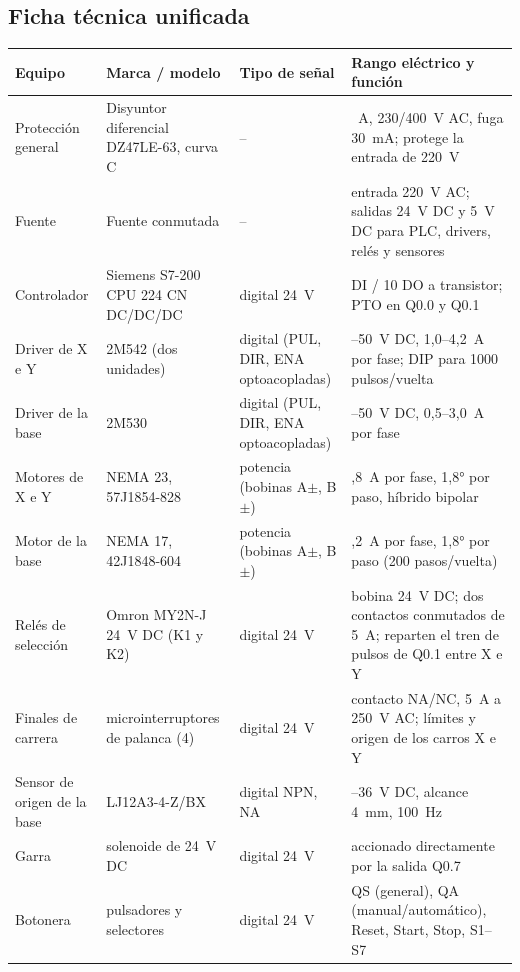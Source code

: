 \documentclass[a4paper,11pt]{article}
\begin{document}
\subsection{Ficha técnica unificada}\label{sec:ficha}
\begin{center}\small
\begin{longtable}{>{\raggedright}p{2.6cm} >{\raggedright}p{3.6cm} >{\raggedright}p{2.4cm} >{\raggedright\arraybackslash}p{5.6cm}}
\toprule
\textbf{Equipo} & \textbf{Marca / modelo} & \textbf{Tipo de señal} & \textbf{Rango eléctrico y función}\\
\midrule\endhead
Protección general & Disyuntor diferencial DZ47LE-63, curva C & -- & 16~A, 230/400~V AC, fuga 30~mA; protege la entrada de 220~V\\
Fuente & Fuente conmutada & -- & entrada 220~V AC; salidas 24~V DC y 5~V DC para PLC, drivers, relés y sensores\\
Controlador & Siemens S7-200 CPU 224 CN DC/DC/DC & digital 24~V & 14 DI / 10 DO a transistor; PTO en Q0.0 y Q0.1\\
Driver de X e Y & 2M542 (dos unidades) & digital (PUL, DIR, ENA optoacopladas) & 20--50~V DC, 1,0--4,2~A por fase; DIP para 1000 pulsos/vuelta\\
Driver de la base & 2M530 & digital (PUL, DIR, ENA optoacopladas) & 18--50~V DC, 0,5--3,0~A por fase\\
Motores de X e Y & NEMA 23, 57J1854-828 & potencia (bobinas A$\pm$, B$\pm$) & 2,8~A por fase, 1,8° por paso, híbrido bipolar\\
Motor de la base & NEMA 17, 42J1848-604 & potencia (bobinas A$\pm$, B$\pm$) & 1,2~A por fase, 1,8° por paso (200 pasos/vuelta)\\
Relés de selección & Omron MY2N-J 24~V DC (K1 y K2) & digital 24~V & bobina 24~V DC; dos contactos conmutados de 5~A; reparten el tren de pulsos de Q0.1 entre X e Y\\
Finales de carrera & microinterruptores de palanca (4) & digital 24~V & contacto NA/NC, 5~A a 250~V AC; límites y origen de los carros X e Y\\
Sensor de origen de la base & LJ12A3-4-Z/BX & digital NPN, NA & 6--36~V DC, alcance 4~mm, 100~Hz\\
Garra & solenoide de 24~V DC & digital 24~V & accionado directamente por la salida Q0.7\\
Botonera & pulsadores y selectores & digital 24~V & QS (general), QA (manual/automático), Reset, Start, Stop, S1--S7\\
\bottomrule
\end{longtable}\end{center}
\end{document}
